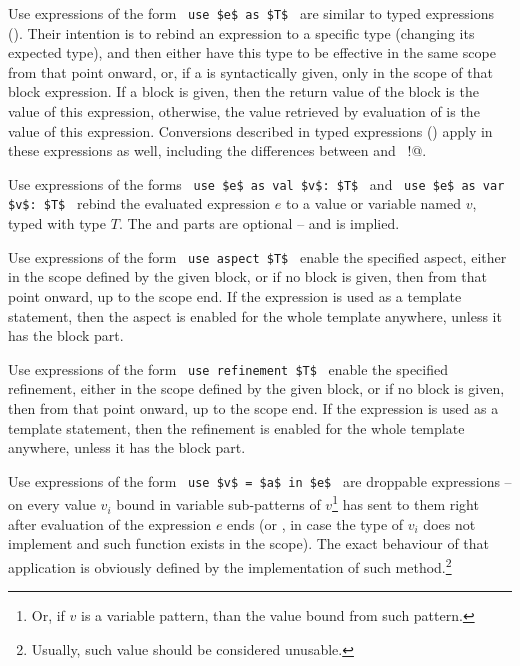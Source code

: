 Use expressions of the form ~\lstinline!use $e$ as $T$!~ are similar to typed expressions (). Their intention is to rebind an expression to a specific type (changing its expected type), and then either have this type to be effective in the same scope from that point onward, or, if a  is syntactically given, only in the scope of that block expression. If a block is given, then the return value of the block is the value of this expression, otherwise, the value retrieved by evaluation of  is the value of this expression. Conversions described in typed expressions () apply in these expressions as well, including the differences between  and ~\lstinline@as!@. 

Use expressions of the forms ~\lstinline!use $e$ as val $v$: $T$!~ and ~\lstinline!use $e$ as var $v$: $T$!~ rebind the evaluated expression $e$ to a value or variable named $v$, typed with type $T$. The  and  parts are optional -- and  is implied. 

Use expressions of the form ~\lstinline!use aspect $T$!~ enable the specified aspect, either in the scope defined by the given block, or if no block is given, then from that point onward, up to the scope end. If the expression is used as a template statement, then the aspect is enabled for the whole template anywhere, unless it has the block part. 

Use expressions of the form ~\lstinline!use refinement $T$!~ enable the specified refinement, either in the scope defined by the given block, or if no block is given, then from that point onward, up to the scope end. If the expression is used as a template statement, then the refinement is enabled for the whole template anywhere, unless it has the block part.

Use expressions of the form ~\lstinline!use $v$ = $a$ in $e$!~ are droppable expressions -- on every value $v_i$ bound in variable sub-patterns of $v$\footnote{Or, if $v$ is a variable pattern, than the value bound from such pattern.} has  sent to them right after evaluation of the expression $e$ ends (or , in case the type of $v_i$ does not implement  and such function exists in the scope). The exact behaviour of that application is obviously defined by the implementation of such method.\footnote{Usually, such value should be considered unusable.}








